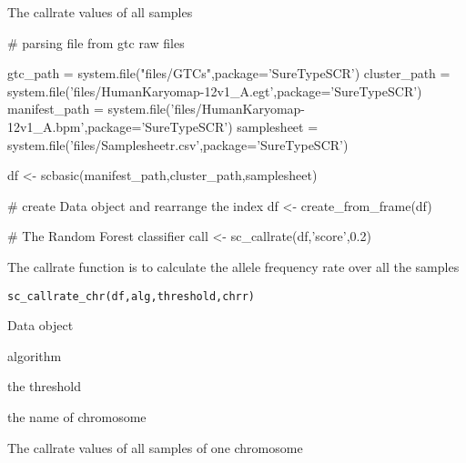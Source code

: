 \documentclass[a4paper]{book}
\begin{document}
%
\begin{Value}
The callrate values of all samples 
\end{Value}
%
\begin{Examples}
\begin{ExampleCode}

# parsing file from gtc raw files

gtc_path = system.file("files/GTCs",package='SureTypeSCR')
cluster_path = system.file('files/HumanKaryomap-12v1_A.egt',package='SureTypeSCR')
manifest_path = system.file('files/HumanKaryomap-12v1_A.bpm',package='SureTypeSCR')
samplesheet = system.file('files/Samplesheetr.csv',package='SureTypeSCR')

df <- scbasic(manifest_path,cluster_path,samplesheet)


# create Data object and rearrange the index
df <- create_from_frame(df)

# The Random Forest classifier
call <- sc_callrate(df,'score',0.2) 




\end{ExampleCode}
\end{Examples}
%
\begin{Description}\relax
The callrate function is to calculate the allele frequency rate over all the samples
\end{Description}
%
\begin{Usage}
\begin{verbatim}
sc_callrate_chr(df,alg,threshold,chrr)
\end{verbatim}
\end{Usage}
%
\begin{Arguments}
\begin{ldescription}
\item[\code{df}] Data object
\item[\code{alg}] algorithm
\item[\code{threshold}] the threshold
\item[\code{chrr}] the name of chromosome
\end{ldescription}
\end{Arguments}
%
\begin{Value}
The callrate values of all samples of one chromosome
\end{Value}
%
\end{document}

